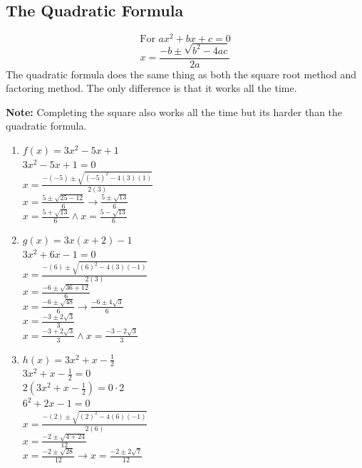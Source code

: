 \subsection{The Quadratic Formula}
\begin{definition}
  $$\text{For } ax^2 + bx + c = 0$$
  $$x = \frac{-b \pm \sqrt{b^2 - 4ac}}{2a}$$
  The quadratic formula does the same thing as both the square root method and factoring method. The only difference is that it works all the time.
\end{definition}

\textbf{Note: }Completing the square also works all the time but its harder than the quadratic formula.

\begin{example}
  \hfill
  \begin{enumerate}
  \item $f(x) = 3x^2 - 5x + 1$ \\
    $3x^2 - 5x + 1 = 0$ \\
    $x = \frac{-(-5) \pm \sqrt{(-5)^2 - 4 (3)(1)}}{2 (3)}$ \\
    $x = \frac{5 \pm \sqrt{25 - 12}}{6} \to \frac{5 \pm \sqrt{13}}{6}$ \\
    $x = \frac{5 + \sqrt{13}}{6} \land x = \frac{5 - \sqrt{13}}{6}$
  \item $g(x) = 3x(x + 2) - 1$ \\
    $3x^2 + 6x - 1 = 0$ \\
    $x = \frac{-(6) \pm \sqrt{(6)^2 - 4 (3)(-1)}}{2 (3)}$ \\
    $x = \frac{-6 \pm \sqrt{36 + 12}}{6}$ \\
    $x = \frac{-6 \pm \sqrt{48}}{6} \to \frac{-6 \pm {4\sqrt{3}}}{6}$ \\
    $x = \frac{-3 \pm 2\sqrt{3}}{3}$ \\
    $x = \frac{-3 + 2\sqrt{3}}{3} \land x = \frac{-3 - 2\sqrt{3}}{3}$
  \item $h(x) = 3x^2 + x - \frac{1}{2}$ \\
    $3x^2 + x - \frac{1}{2} = 0$ \\
    $2(3x^2 + x - \frac{1}{2}) = 0 \cdot 2$ \\
    $6^2 + 2x - 1 = 0$ \\
    $x = \frac{-(2) \pm \sqrt{(2)^2 - 4 (6)(-1)}}{2 (6)}$ \\
    $x = \frac{-2 \pm \sqrt{4 + 24}}{12}$ \\
    $x = \frac{-2 \pm \sqrt{28}}{12} \to x = \frac{-2 \pm 2\sqrt{7}}{12}$ \\

\end{enumerate}
\end{example}
